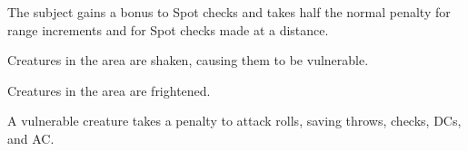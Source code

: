 \spellrng{\rngtouch}
\begin{spelleffect}
  The subject gains a  bonus to Spot checks and takes half the normal penalty for range increments and for Spot checks made at a distance. \bonusscalingdescription
\end{spelleffect}

\begin{spellhealthy}
  Creatures in the area are shaken, causing them to be vulnerable.
\end{spellhealthy}
\begin{spellblood}
  Creatures in the area are frightened.
\end{spellblood}
\begin{spellnotes}
  A vulnerable creature takes a  penalty to attack rolls, saving throws, checks, DCs, and AC.
\end{spellnotes}

